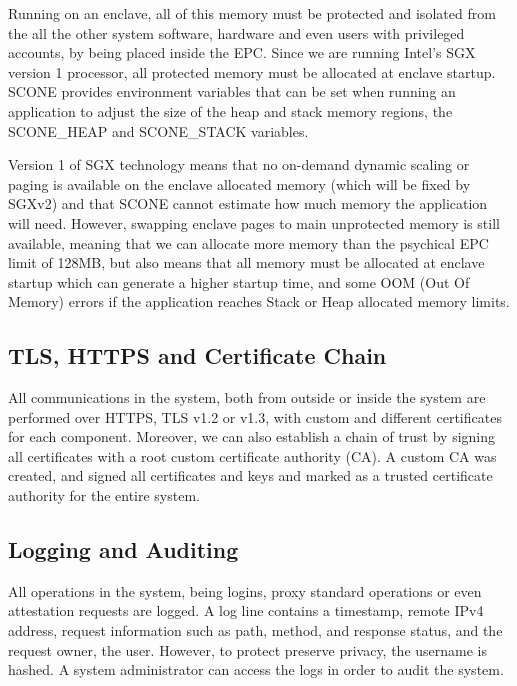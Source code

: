Running on an enclave, all of this memory must be protected and isolated from the all the other system software, hardware and even users with privileged accounts, by being placed inside the \gls{EPC}. Since we are running Intel's \gls{SGX} version 1 processor, all protected memory must be allocated at enclave startup. SCONE provides environment variables that can be set when running an application to adjust the size of the heap and stack memory regions, the SCONE\_HEAP and SCONE\_STACK variables.

Version 1 of \gls{SGX} technology means that no on-demand dynamic scaling or paging is available on the enclave allocated memory (which will be fixed by \gls{SGX}v2) and that SCONE cannot estimate how much memory the application will need. However, swapping enclave pages to main unprotected memory is still available, meaning that we can allocate more memory than the psychical \gls{EPC} limit of 128\gls{MB}, but also means that all memory must be allocated at enclave startup which can generate a higher startup time, and some \gls{OOM} (Out Of Memory) errors if the application reaches Stack or Heap allocated memory limits.

\subsection{TLS, HTTPS and Certificate Chain}
\label{ssec:tls_https_certificate_chain}

All communications in the system, both from outside or inside the system are performed over \gls{HTTPS}, \gls{TLS} v1.2 or v1.3, with custom and different certificates for each component. Moreover, we can also establish a chain of trust by signing all certificates with a root custom certificate authority (\gls{CA}). A custom \gls{CA} was created, and signed all certificates and keys and marked as a trusted certificate authority for the entire system.

\subsection{Logging and Auditing} 
\label{sec:logging_and_auditing}

All operations in the system, being logins, proxy standard operations or even attestation requests are logged. A log line contains a timestamp, remote \gls{IP}v4 address, request information such as path, method, and response status, and the request owner, the user. However, to protect preserve privacy, the username is hashed. A system administrator can access the logs in order to audit the system.

